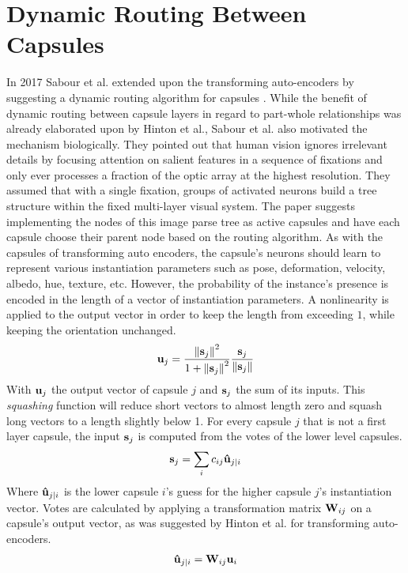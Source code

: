 \section{Dynamic Routing Between Capsules}\label{sec:dynamic-routing}
In 2017 Sabour et al. extended upon the transforming auto-encoders by suggesting a dynamic routing algorithm for capsules \cite{sabour2017dynamic}. While the benefit of dynamic routing between capsule layers in regard to part-whole relationships was already elaborated upon by Hinton et al., Sabour et al. also motivated the mechanism biologically. They pointed out that human vision ignores irrelevant details by focusing attention on salient features in a sequence of fixations and only ever processes a fraction of the optic array at the highest resolution. They assumed that with a single fixation, groups of activated neurons build a tree structure within the fixed multi-layer visual system. The paper suggests implementing the nodes of this image parse tree as active capsules and have each capsule choose their parent node based on the routing algorithm. As with the capsules of transforming auto encoders, the capsule's neurons should learn to represent various instantiation parameters such as pose, deformation, velocity, albedo, hue, texture, etc. However, the probability of the instance's presence is encoded in the length of a vector of instantiation parameters. A nonlinearity is applied to the output vector in order to keep the length from exceeding $\num{1}$, while keeping the orientation unchanged.
\begin{align}
    \vb{u}_j = \frac{\norm{\vb{s}_j}^2}{1+\norm{\vb{s}_j}^2}\frac{\vb{s}_j}{\norm{\vb{s}_j}}
    \label{eq:squash}
\end{align}
With $\vb{u}_j$ the output vector of capsule $j$ and $\vb{s}_j$ the sum of its inputs. This \emph{squashing} function will reduce short vectors to almost length zero and squash long vectors to a length slightly below 1. For every capsule $j$ that is not a first layer capsule, the input $\vb{s}_j$ is computed from the votes of the lower level capsules.
\begin{align}
    \vb{s}_j = \sum_i c_{ij} \vb{\hat{u}}_{j|i}
\end{align}
Where $\vb{\hat{u}}_{j|i}$ is the lower capsule $i$'s guess for the higher capsule $j$'s instantiation vector. Votes are calculated by applying a transformation matrix $\vb{W}_{ij}$ on a capsule's output vector, as was suggested by Hinton et al. for transforming auto-encoders.
\begin{align}
    \vb{\hat{u}}_{j|i} = \vb{W}_{ij}\vb{u}_i
\end{align}
